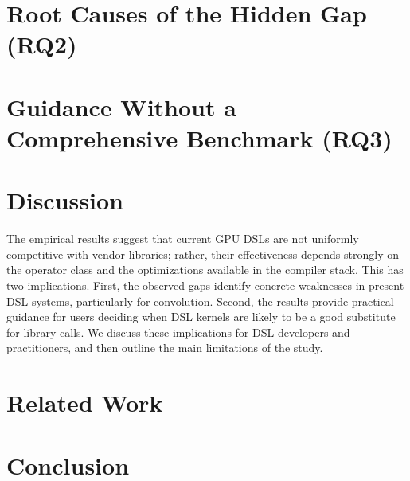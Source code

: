 \documentclass[10pt,conference]{IEEEtran}
\begin{document}
\section{Root Causes of the Hidden Gap (RQ2)}
\label{sec:analysis}


\section{Guidance Without a Comprehensive Benchmark (RQ3)}
\label{sec:mitigation}


\section{Discussion}
\label{sec:discussion}

The empirical results suggest that current GPU DSLs are not uniformly competitive with vendor libraries; rather, their effectiveness depends strongly on the operator class and the optimizations available in the compiler stack. This has two implications. First, the observed gaps identify concrete weaknesses in present DSL systems, particularly for convolution. Second, the results provide practical guidance for users deciding when DSL kernels are likely to be a good substitute for library calls. We discuss these implications for DSL developers and practitioners, and then outline the main limitations of the study.


\section{Related Work}
\label{sec:related}


% 

\section{Conclusion}
\label{sec:conclusion}

\end{document}

